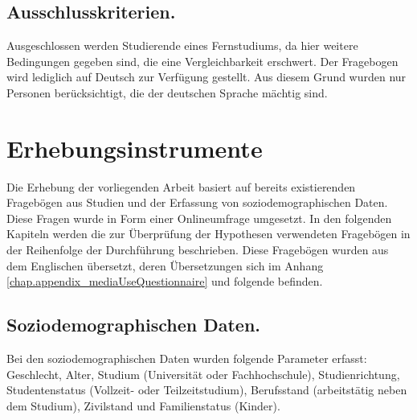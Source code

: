 \subsection{Ausschlusskriterien.}\label{subsection.ausschlusskriterien}
Ausgeschlossen werden Studierende eines Fernstudiums, da hier weitere Bedingungen gegeben sind, die eine Vergleichbarkeit erschwert. Der Fragebogen wird lediglich auf Deutsch zur Verfügung gestellt. Aus diesem Grund wurden nur Personen berücksichtigt, die der deutschen Sprache mächtig sind. 

\section{Erhebungsinstrumente}\label{section.erhebungsinstrumente}
Die Erhebung der vorliegenden Arbeit basiert auf bereits existierenden Fragebögen aus Studien und der Erfassung von soziodemographischen Daten. Diese Fragen wurde in Form einer Onlineumfrage umgesetzt. In den folgenden Kapiteln werden die zur Überprüfung der Hypothesen verwendeten Fragebögen in der Reihenfolge der Durchführung beschrieben. Diese Fragebögen wurden aus dem Englischen übersetzt, deren Übersetzungen sich im Anhang \ref{chap.appendix_mediaUseQuestionnaire} und folgende befinden.

\subsection{Soziodemographischen Daten.}\label{subsection.soziDaten}
Bei den soziodemographischen Daten wurden folgende Parameter erfasst: Geschlecht, Alter, Studium (Universität oder Fachhochschule), Studienrichtung, Studentenstatus (Vollzeit- oder Teilzeitstudium), Berufsstand (arbeitstätig neben dem Studium), Zivilstand und Familienstatus (Kinder). \\

